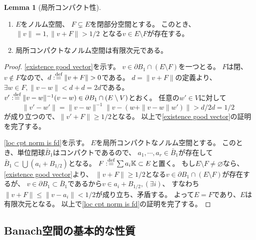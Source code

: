 \documentclass[uplatex]{jsarticle}
\theoremstyle{definition}
\newtheorem{lem}[lem]{Lemma}
\renewcommand{\emptyset}{\varnothing}
\newcommand{\dfn}{:\overset{\mbox{{\scriptsize def}}}{=}}
\newcommand{\dl}{\partial}
\newcommand{\K}{\mathbb{K}}
\begin{document}
\begin{lem}[局所コンパクト性]
  \label{lem: loc cpt norm sp}
  \
  \begin{enumerate}
    \item \label{existence good vector}
    \(E\)をノルム空間、
    \(F\subsetneq E\)を閉部分空間とする。
    このとき、
    \(\|v\| = 1, \|v+F\| > 1/2\)
    となる\(v\in E\setminus F\)が存在する。
    \item \label{loc cpt norm is fd}
    局所コンパクトなノルム空間は有限次元である。
  \end{enumerate}
\end{lem}

\begin{proof}
  \ref{existence good vector}を示す。
  \(v\in \dl B_1 \cap (E\setminus F)\)を一つとる。
  \(F\)は閉、\(v\not\in F\)なので、\(d \dfn \|v+F\| > 0\)である。
  \(d = \|v+F\|\)の定義より、\(\exists w\in F, \|v-w\| < d+d = 2d\)である。
  \(v'\dfn \|v-w\|^{-1}(v-w)\in \dl B_1 \cap (E\setminus V)\)とおく。
  任意の\(w'\in V\)に対して
  \[
  \|v'-w'\| = \|v-w\|^{-1}\| v - (w + \|v-w\|w')\| > d/2d = 1/2
  \]
  が成り立つので、\(\|v'+F\| \geq 1/2\)となる。
  以上で\ref{existence good vector}の証明を完了する。

  \ref{loc cpt norm is fd}を示す。
  \(E\)を局所コンパクトなノルム空間とする。
  このとき、単位閉球\(\bar{B}_1\)はコンパクトであるので、
  \(a_1,\cdots,a_r\in \bar{B}_1\)が存在して
  \(\bar{B}_1\subset \bigcup (a_i + B_{1/2})\)となる。
  \(F\dfn \sum a_i\K\subset E\)と置く。
  もし\(E\setminus F\neq \emptyset\)なら、
  \ref{existence good vector}より、
  \(\|v+F\| \geq 1/2\)となる\(v\in \dl B_1\cap (E\setminus F)\)が存在するが、
  \(v\in \dl B_1\subset \bar{B}_1\)であるから\(v\in a_i + B_{1/2}, (\exists i)\)、
  すなわち\(\|v+F\| \leq \|v-a_i\| < 1/2\)が成り立ち、矛盾する。
  よって\(E=F\)であり、\(E\)は有限次元となる。
  以上で\ref{loc cpt norm is fd}の証明を完了する。
\end{proof}




\subsection{Banach空間の基本的な性質}
\end{document}
